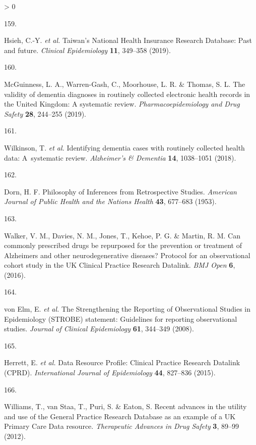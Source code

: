 \documentclass[a4paper, twoside]{templates/ociamthesis}
\newlength{\cslhangindent}
\newlength{\csllabelwidth}
\newenvironment{CSLReferences}[3] %
 {%
  \setlength{\parindent}{0pt}
  \ifodd #1 \everypar{\setlength{\hangindent}{\cslhangindent}}\ignorespaces\fi
  \ifnum #2 > 0
  \setlength{\parskip}{#2\baselineskip}
  \fi
 }%
 {}
\newcommand{\CSLLeftMargin}[1]{\parbox[t]{\maxof{\widthof{#1}}{\csllabelwidth}}{#1}}
\newcommand{\CSLRightInline}[1]{\parbox[t]{\linewidth - \csllabelwidth}{#1}}
\begin{document}
\begin{CSLReferences}{0}{0}
\leavevmode\hypertarget{ref-hsieh2019}{}%
\CSLLeftMargin{159. }
\CSLRightInline{Hsieh, C.-Y. \emph{et al.} Taiwan's {National Health Insurance Research Database}: Past and future. \emph{Clinical Epidemiology} \textbf{11}, 349--358 (2019).}

\leavevmode\hypertarget{ref-mcguinness2019validity}{}%
\CSLLeftMargin{160. }
\CSLRightInline{McGuinness, L. A., Warren-Gash, C., Moorhouse, L. R. \& Thomas, S. L. The validity of dementia diagnoses in routinely collected electronic health records in the {United Kingdom}: {A} systematic review. \emph{Pharmacoepidemiology and Drug Safety} \textbf{28}, 244--255 (2019).}

\leavevmode\hypertarget{ref-wilkinson2018}{}%
\CSLLeftMargin{161. }
\CSLRightInline{Wilkinson, T. \emph{et al.} Identifying dementia cases with routinely collected health data: {A}~systematic review. \emph{Alzheimer's \& Dementia} \textbf{14}, 1038--1051 (2018).}

\leavevmode\hypertarget{ref-dorn1953}{}%
\CSLLeftMargin{162. }
\CSLRightInline{Dorn, H. F. Philosophy of {Inferences} from {Retrospective Studies}. \emph{American Journal of Public Health and the Nations Health} \textbf{43}, 677--683 (1953).}

\leavevmode\hypertarget{ref-walker2016}{}%
\CSLLeftMargin{163. }
\CSLRightInline{Walker, V. M., Davies, N. M., Jones, T., Kehoe, P. G. \& Martin, R. M. Can commonly prescribed drugs be repurposed for the prevention or treatment of {Alzheimers} and other neurodegenerative diseases? {Protocol} for an observational cohort study in the {UK Clinical Practice Research Datalink}. \emph{BMJ Open} \textbf{6}, (2016).}

\leavevmode\hypertarget{ref-vonelm2008}{}%
\CSLLeftMargin{164. }
\CSLRightInline{von Elm, E. \emph{et al.} The {Strengthening} the {Reporting} of {Observational Studies} in {Epidemiology} ({STROBE}) statement: Guidelines for reporting observational studies. \emph{Journal of Clinical Epidemiology} \textbf{61}, 344--349 (2008).}

\leavevmode\hypertarget{ref-herrett2015}{}%
\CSLLeftMargin{165. }
\CSLRightInline{Herrett, E. \emph{et al.} Data {Resource Profile}: {Clinical Practice Research Datalink} ({CPRD}). \emph{International Journal of Epidemiology} \textbf{44}, 827--836 (2015).}

\leavevmode\hypertarget{ref-williams2012}{}%
\CSLLeftMargin{166. }
\CSLRightInline{Williams, T., van Staa, T., Puri, S. \& Eaton, S. Recent advances in the utility and use of the {General Practice Research Database} as an example of a {UK Primary Care Data} resource. \emph{Therapeutic Advances in Drug Safety} \textbf{3}, 89--99 (2012).}


\end{CSLReferences}
\end{document}

